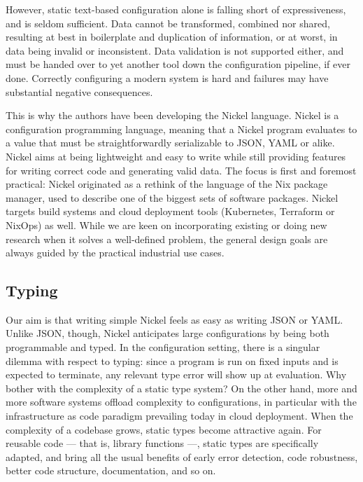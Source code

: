 \documentclass[sigplan,10pt,review,anonymous]{acmart}
\begin{document}
However, static text-based configuration alone is falling short of
expressiveness, and is seldom sufficient. Data cannot be transformed, combined
nor shared, resulting at best in boilerplate and duplication of information, or
at worst, in data being invalid or inconsistent. Data validation is not
supported either, and must be handed over to yet another tool down the
configuration pipeline, if ever done. Correctly configuring a modern system is
hard and failures may have substantial negative consequences.

This is why the authors have been developing the Nickel
language\cite{NickelRepo}. Nickel is a configuration programming language,
meaning that a Nickel program evaluates to a value that must be
straightforwardly serializable to JSON, YAML or alike. Nickel aims at being
lightweight and easy to write while still providing features for writing correct
code and generating valid data. The focus is first and foremost practical:
Nickel originated as a rethink of the language of the Nix package manager, used
to describe one of the biggest sets of software packages\cite{repology}.  Nickel
targets build systems and cloud deployment tools (Kubernetes, Terraform or
NixOps) as well. While we are keen on incorporating existing or doing new
research when it solves a well-defined problem, the general design goals are
always guided by the practical industrial use cases.

\subsection{Typing}

Our aim is that writing simple Nickel feels as easy as writing JSON or YAML.
Unlike JSON, though, Nickel anticipates large configurations by being both
programmable and typed. In the configuration setting, there is a singular
dilemma with respect to typing: since a program is run on fixed inputs and is
expected to terminate, any relevant type error will show up at evaluation.  Why
bother with the complexity of a static type system? On the other hand, more and
more software systems offload complexity to configurations, in particular with
the infrastructure as code paradigm prevailing today in cloud deployment. When
the complexity of a codebase grows, static types become attractive again.  For
reusable code — that is, library functions —, static types are specifically
adapted, and bring all the usual benefits of early error detection, code
robustness, better code structure, documentation, and so on.
\end{document}
